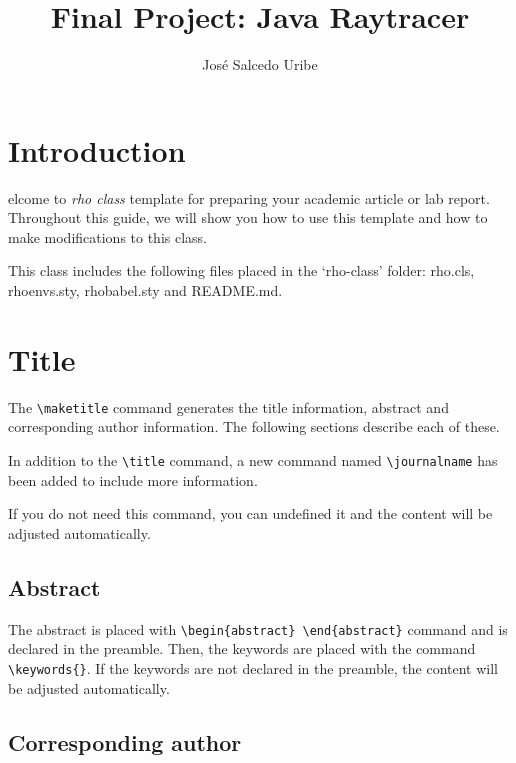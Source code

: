 \documentclass[9pt,a4paper,twoside]{rho-class/rho}
\title{Final Project: Java Raytracer}
\author[1,$\dagger$]{José Salcedo Uribe}
\begin{document}
	
    \maketitle
    \thispagestyle{firststyle}


\section{Introduction}

    elcome to \textit{rho class} template for preparing your academic article or lab report. Throughout this guide, we will show you how to use this template and how to make modifications to this class. 
    
    This class includes the following files placed in the ‘rho-class’ folder: rho.cls, rhoenvs.sty, rhobabel.sty and README.md.

\section{Title}

    The \verb|\maketitle| command generates the title information, abstract and corresponding author information. The following sections describe each of these.

    In addition to the \verb|\title| command, a new command named \verb|\journalname| has been added to include more information. 

    If you do not need this command, you can undefined it and the content will be adjusted automatically.

    \subsection{Abstract}

        The abstract is placed with \verb|\begin{abstract} \end{abstract}| command and is declared in the preamble. Then, the keywords are placed with the command \verb|\keywords{}|. If the keywords are not declared in the preamble, the content will be adjusted automatically.

    \subsection{Corresponding author}
\end{document}
